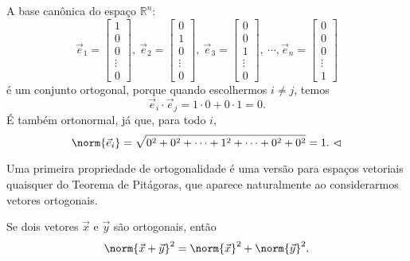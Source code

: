 \begin{ex}
	A base canônica do espaço $\mathbb{R}^n$:
	\begin{equation}
	\vec{e}_1 =
	\begin{bmatrix}
	1 \\ 0 \\ 0 \\ \vdots \\ 0
	\end{bmatrix}, \
	\vec{e}_2 =
	\begin{bmatrix}
	0 \\ 1 \\ 0 \\ \vdots \\ 0
	\end{bmatrix}, \
	\vec{e}_3 =
	\begin{bmatrix}
	0 \\ 0 \\ 1 \\ \vdots \\ 0
	\end{bmatrix}, \ \cdots,
	\vec{e}_n =
	\begin{bmatrix}
	0 \\ 0 \\ 0 \\ \vdots \\ 1
	\end{bmatrix}
	\end{equation} é um conjunto ortogonal, porque quando escolhermos $i\neq j$, temos
	\begin{equation}
	\vec{e}_i \cdot \vec{e}_j = 1 \cdot 0 + 0 \cdot 1 = 0.
	\end{equation} É também ortonormal, já que, para todo $i$,
	\begin{equation}
	\norm{\vec{e}_i}  = \sqrt{0^2 + 0^2 + \cdots + 1^2 + \cdots + 0^2 + 0^2} = 1. \ \lhd
	\end{equation}
\end{ex}

Uma primeira propriedade de ortogonalidade é uma versão para espaços vetoriais quaisquer do Teorema de Pitágoras, que aparece naturalmente ao considerarmos vetores ortogonais.

\begin{teo}
	Se dois vetores $\vec{x}$ e $\vec{y}$ são ortogonais, então
	\begin{equation}
	\norm{\vec{x} + \vec{y}}^2 = \norm{\vec{x}}^2 + \norm{\vec{y}}^2.
	\end{equation}
\end{teo}

